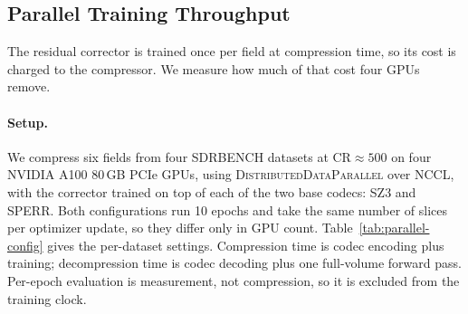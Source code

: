 
\subsection{Parallel Training Throughput}
\label{sec:eval-parallel}

The residual corrector is trained once per field at compression time, so its
cost is charged to the compressor. We measure how much of that cost four GPUs
remove.

\paragraph{Setup.} We compress six fields from four SDRBENCH datasets at
$\mathrm{CR}\!\approx\!500$ on four NVIDIA A100 80\,GB PCIe GPUs, using
\textsc{DistributedDataParallel} over NCCL, with the corrector trained on top
of each of the two base codecs: SZ3 and SPERR. Both configurations run 10
epochs and take the same number of slices per optimizer update, so they differ
only in GPU count. Table~\ref{tab:parallel-config} gives the per-dataset
settings. Compression time is codec encoding plus training; decompression time
is codec decoding plus one full-volume forward pass. Per-epoch evaluation is
measurement, not compression, so it is excluded from the training clock.

